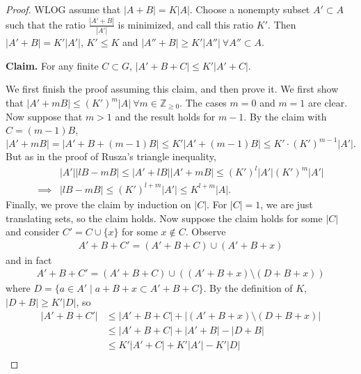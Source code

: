 \documentclass{article}
\theoremstyle{definition}
\begin{document}
\begin{proof}
    WLOG assume that $\left|A+B\right|=K\left|A\right|$. Choose a nonempty subset $A' \subset A$ such that the ratio $\frac{\left|A'+B\right|}{\left|A'\right|}$ is minimized, and call this ratio $K'$. Then $\left|A'+B\right|=K'\left|A'\right|$, $K'\le K$ and $\left|A''+B\right|\ge K'\left|A''\right| ~\forall A'' \subset A$.
    \vspace{1mm}
     
    \textbf{Claim.} For any finite $C \subset G$, $\left|A'+B+C\right|\le K'\left|A'+C\right|$.
    \vspace{1mm}
     
    We first finish the proof assuming this claim, and then prove it. We first show that $\left|A'+mB\right|\le (K')^m\left|A\right| ~\forall m \in \mathbb{Z}_{\ge 0}$. The cases $m=0$ and $m=1$ are clear. Now suppose that $m>1$ and the result holds for $m-1$. By the claim with $C=(m-1)B$, \[
    \left|A' + mB\right| = \left|A'+B+(m-1)B\right| \le K'\left|A'+(m-1)B\right|\le K'\cdot (K')^{m-1}\left|A'\right|.
    \]
    But as in the proof of Rusza's triangle inequality, 
    \begin{align*}
        &\left|A'\right|\left|lB-mB\right| \le \left|A' + lB\right|\left|A'+mB\right| \le (K')^l \left|A'\right|(K')^m \left|A'\right|\\
        \implies & \left|lB-mB\right|\le (K')^{l+m}\left|A'\right|\le K^{l+m}\left|A\right|.
    \end{align*}
    Finally, we prove the claim by induction on $\left|C\right|$. For $\left|C\right|=1$, we are just translating sets, so the claim holds. Now suppose the claim holds for some $\left|C\right|$ and consider $C' = C \cup \{x\}$ for some $x \not\in C$. Observe 
    \begin{align*}
        A'+B+C' = (A' + B + C) \cup (A'+B+x)
    \end{align*}
    and in fact 
    \begin{align*}
        A'+B+C' = (A'+B+C) \cup ((A'+B+x) \setminus (D+B+x))
    \end{align*}
    where $D = \{a \in A' \mid a+B+x \subset A'+B+C\}$. By the definition of $K$, $\left|D+B\right|\ge K'\left|D\right|$, so 
    \begin{align*}
        \left|A'+B+C'\right| &\le \left|A'+B+C\right|+\left|(A'+B+x)\setminus (D+B+x)\right| \\
        &\le \left|A'+B+C\right| + \left|A'+B\right| - \left|D+B\right|\\
        &\le K'\left|A'+C\right| + K'\left|A'\right| - K'\left|D\right|\\

\end{align*}
\end{proof}
\end{document}
